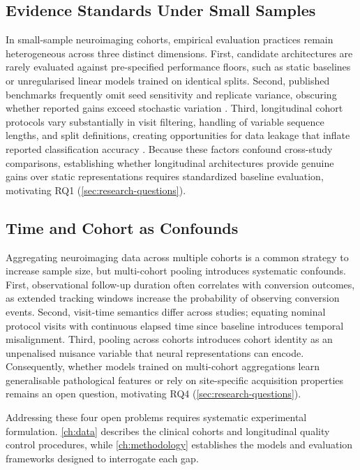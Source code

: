 \subsection{Evidence Standards Under Small Samples}\label{sec:gap-evidence}

In small-sample neuroimaging cohorts, empirical evaluation practices remain heterogeneous
across three distinct dimensions. First, candidate architectures are rarely evaluated against
pre-specified performance floors, such as static baselines or unregularised linear models
trained on identical splits. Second, published benchmarks frequently omit seed sensitivity
and replicate variance, obscuring whether reported gains exceed stochastic variation
\parencite{cui2023braingb}. Third, longitudinal cohort protocols vary substantially in visit
filtering, handling of variable sequence lengths, and split definitions, creating opportunities
for data leakage that inflate reported classification accuracy
\parencite{shim2021leakage,yagis2021leakage,rosenblatt2024leakage}. Because these factors
confound cross-study comparisons, establishing whether longitudinal architectures provide
genuine gains over static representations requires standardized baseline evaluation, motivating
RQ1 (\autoref{sec:research-questions}).

\subsection{Time and Cohort as Confounds}\label{sec:gap-confounds}

Aggregating neuroimaging data across multiple cohorts is a common strategy to increase
sample size, but multi-cohort pooling introduces systematic confounds. First, observational
follow-up duration often correlates with conversion outcomes, as extended tracking windows
increase the probability of observing conversion events. Second, visit-time semantics differ
across studies; equating nominal protocol visits with continuous elapsed time since baseline
introduces temporal misalignment. Third, pooling across cohorts introduces cohort identity
as an unpenalised nuisance variable that neural representations can encode. Consequently,
whether models trained on multi-cohort aggregations learn generalisable pathological features
or rely on site-specific acquisition properties remains an open question, motivating RQ4
(\autoref{sec:research-questions}).

\bigskip

Addressing these four open problems requires systematic experimental formulation.
\autoref{ch:data} describes the clinical cohorts and longitudinal quality control procedures,
while \autoref{ch:methodology} establishes the models and evaluation frameworks designed to
interrogate each gap.


